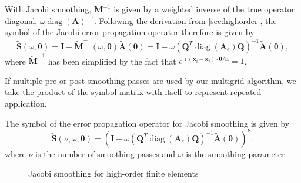 \documentclass[review]{siamart190516}
\DeclareMathOperator{\diag}{diag}
\begin{document}
With Jacobi smoothing, $\mathbf{M}^{-1}$ is given by a weighted inverse of the true operator diagonal, $\omega \diag \left( \mathbf{A} \right)^{-1}$.
Following the derivation from \cref{sec:highorder}, the symbol of the Jacobi error propagation operator therefore is given by
\begin{equation}
\tilde{\mathbf{S}} \left( \omega, \boldsymbol{\theta} \right) = \mathbf{I} - \tilde{\mathbf{M}}^{-1} \left( \omega, \boldsymbol{\theta} \right) \tilde{\mathbf{A}} \left( \boldsymbol{\theta} \right) = \mathbf{I} - \omega \left( \mathbf{Q}^T \diag \left( \mathbf{A}_e \right) \mathbf{Q} \right)^{-1} \tilde{\mathbf{A}} \left( \boldsymbol{\theta} \right),
\end{equation}
where $\tilde{\mathbf{M}}^{-1}$ has been simplified by the fact that $e^{\imath \left( \mathbf{x}_i - \mathbf{x}_i \right) \cdot \boldsymbol{\theta} / \mathbf{h}} = 1$.

If multiple pre or post-smoothing passes are used by our multigrid algorithm, we take the product of the symbol matrix with itself to represent repeated application.

\begin{definition}
The symbol of the error propagation operator for Jacobi smoothing is given by
\begin{equation}
\tilde{\mathbf{S}} \left( \nu, \omega, \boldsymbol{\theta} \right) = \left( \mathbf{I} - \omega \left( \mathbf{Q}^T \diag \left( \mathbf{A}_e \right) \mathbf{Q} \right)^{-1} \tilde{\mathbf{A}} \left( \boldsymbol{\theta} \right) \right)^\nu,
\end{equation}
where $\nu$ is the number of smoothing passes and $\omega$ is the smoothing parameter.
\end{definition}\label{def:jacobi_symbol}

\begin{figure}[!tbp]
  \centering
  \hfill
  \caption{Jacobi smoothing for high-order finite elements}
\end{figure}
\end{document}
